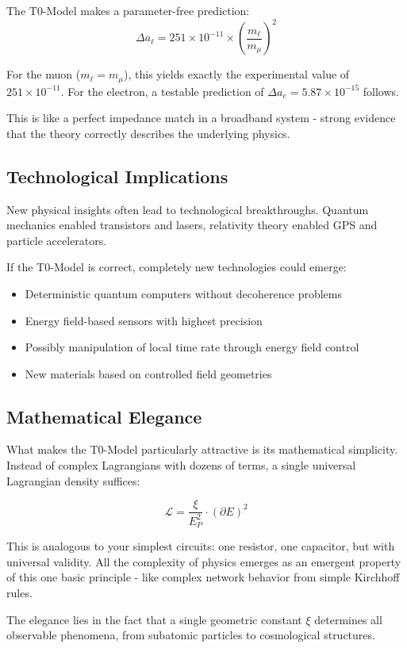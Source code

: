 \documentclass[12pt,a4paper]{article}
\begin{document}
The T0-Model makes a parameter-free prediction:
$$\Delta a_\ell = 251 \times 10^{-11} \times \left(\frac{m_\ell}{m_\mu}\right)^2$$

For the muon ($m_\ell = m_\mu$), this yields exactly the experimental value of $251 \times 10^{-11}$. For the electron, a testable prediction of $\Delta a_e = 5.87 \times 10^{-15}$ follows.

This is like a perfect impedance match in a broadband system - strong evidence that the theory correctly describes the underlying physics.

\subsection{Technological Implications}

New physical insights often lead to technological breakthroughs. Quantum mechanics enabled transistors and lasers, relativity theory enabled GPS and particle accelerators.

If the T0-Model is correct, completely new technologies could emerge:
\begin{itemize}
	\item Deterministic quantum computers without decoherence problems
	\item Energy field-based sensors with highest precision
	\item Possibly manipulation of local time rate through energy field control
	\item New materials based on controlled field geometries
\end{itemize}

\subsection{Mathematical Elegance}

What makes the T0-Model particularly attractive is its mathematical simplicity. Instead of complex Lagrangians with dozens of terms, a single universal Lagrangian density suffices:

$$\mathcal{L} = \frac{\xi}{E_P^2} \cdot (\partial E)^2$$

This is analogous to your simplest circuits: one resistor, one capacitor, but with universal validity. All the complexity of physics emerges as an emergent property of this one basic principle - like complex network behavior from simple Kirchhoff rules.

The elegance lies in the fact that a single geometric constant $\xi$ determines all observable phenomena, from subatomic particles to cosmological structures.	
\end{document}
